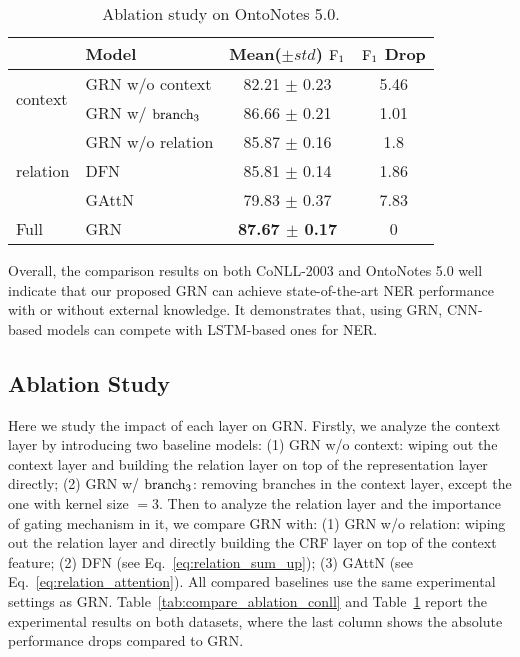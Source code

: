\documentclass[letterpaper]{article} \usepackage{aaai19}  \usepackage{times}  \usepackage{helvet}  \usepackage{courier}  \usepackage{url}  \usepackage{graphicx}  \usepackage{amsmath}
\newcommand{\GAN}{GAttN}
\newcommand{\GRN}{GRN}
\begin{document}
\begin{table}[t!]
  \centering
    \begin{adjustbox}{max width=0.9\columnwidth}
    \begin{tabular}{|l|l|c|c|}
      \hline
       &Model & Mean($\pm std$) $\rm{F_1}$ & $\rm{F_1}$ Drop  \\ \hline
       \multirow{2}{*}{context} &\GRN{} w/o context & 82.21 $\pm$ 0.23 & 5.46 \\ \cline{2-4}
        &\GRN{} w/ $\rm branch_3$ & 86.66 $\pm$ 0.21 & 1.01 \\ \hline
       \hline
       \multirow{3}{*}{relation} &\GRN{} w/o relation & 85.87 $\pm$ 0.16 & 1.8 \\ \cline{2-4}
       &DFN & 85.81 $\pm$ 0.14  & 1.86\\ \cline{2-4}
       &\GAN{} & 79.83 $\pm$ 0.37  & 7.83\\ \hline
       \hline
       Full&\GRN{} & \textbf{87.67 $\pm$ 0.17}  & 0\\ \hline
    \end{tabular}
    \end{adjustbox}
    \caption{Ablation study on OntoNotes 5.0.}\label{tab:compare_ablation_ontonote}
\end{table}

Overall, the comparison results on both CoNLL-2003 and OntoNotes 5.0 well indicate that our proposed \GRN{} can achieve state-of-the-art NER performance with or without external knowledge. It demonstrates that, using \GRN{}, CNN-based models can compete with LSTM-based ones for NER.

\subsection{Ablation Study}
Here we study the impact of each layer on \GRN{}. Firstly, we analyze the context layer by introducing two baseline models: (1) \GRN{} w/o context: wiping out the context layer and building the relation layer on top of the representation layer directly; (2) \GRN{} w/ $\rm branch_3$: removing branches in the context layer, except the one with kernel size $= 3$. Then to analyze the relation layer and the importance of gating mechanism in it, we compare \GRN{} with: (1) \GRN{} w/o relation: wiping out the relation layer and directly building the CRF layer on top of the context feature; (2) DFN (see Eq.~\ref{eq:relation_sum_up}); (3) \GAN{} (see Eq.~\ref{eq:relation_attention}). All compared baselines use the same experimental settings as \GRN{}. Table~\ref{tab:compare_ablation_conll} and Table~\ref{tab:compare_ablation_ontonote} report the experimental results on both datasets, where the last column shows the absolute performance drops compared to \GRN{}.
\end{document}

